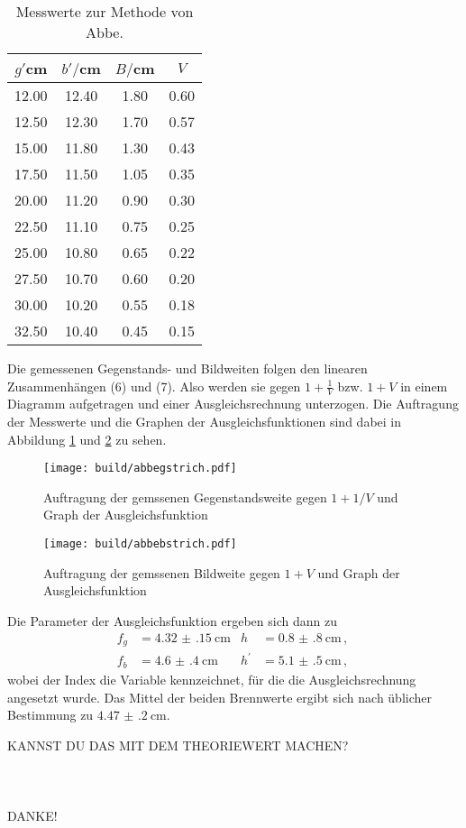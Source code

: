 \begin{table}[htp]
	\begin{center}
    \caption{Messwerte zur Methode von Abbe.}
    \label{tab:abbe}
		\begin{tabular}{cccc}
		\toprule
			{$g'$cm} & {$b'/$cm} & {$B/$cm} & {$V$}\\
			\midrule
			12.00 & 12.40 & 1.80 & 0.60\\
			12.50 & 12.30 & 1.70 & 0.57\\
			15.00 & 11.80 & 1.30 & 0.43\\
			17.50 & 11.50 & 1.05 & 0.35\\
			20.00 & 11.20 & 0.90 & 0.30\\
			22.50 & 11.10 & 0.75 & 0.25\\
			25.00 & 10.80 & 0.65 & 0.22\\
			27.50 & 10.70 & 0.60 & 0.20\\
			30.00 & 10.20 & 0.55 & 0.18\\
			32.50 & 10.40 & 0.45 & 0.15\\
		\bottomrule
		\end{tabular}
	\end{center}
\end{table}

Die gemessenen Gegenstands- und Bildweiten folgen den linearen Zusammenhängen
(6) und (7). Also werden sie gegen $1+\frac{1}{V}$ bzw. $1+V$ in einem Diagramm
aufgetragen und einer Ausgleichsrechnung unterzogen. Die Auftragung der Messwerte
und die Graphen der Ausgleichsfunktionen sind dabei in Abbildung \ref{fig:gstrich}
und \ref{fig:bstrich} zu sehen.

\begin{figure}%
  \centering
  \texttt{[image: build/abbegstrich.pdf]}
  \caption{Auftragung der gemssenen Gegenstandsweite gegen $1+1/V$ und Graph der Ausgleichsfunktion}
  \label{fig:gstrich}
\end{figure}

\begin{figure}%
  \centering
  \texttt{[image: build/abbebstrich.pdf]}
  \caption{Auftragung der gemssenen Bildweite gegen $1+V$ und Graph der Ausgleichsfunktion}
  \label{fig:bstrich}
\end{figure}

Die Parameter der Ausgleichsfunktion ergeben sich dann zu
\begin{align*}
	f_g &= \SI{4.32(15)}{\centi\meter}		&		h &= \SI{0.8(8)}{\centi\meter}\,,\ \\
	f_b &= \SI{4.6(4)}{\centi\meter}		&		h^\prime &= \SI{5.1(5)}{\centi\meter}\,,
\end{align*}
wobei der Index die Variable kennzeichnet, für die die Ausgleichsrechnung
angesetzt wurde. Das Mittel der beiden Brennwerte ergibt sich nach üblicher
Bestimmung zu $\SI{4.47(20)}{\centi\meter}$.

KANNST DU DAS MIT DEM THEORIEWERT MACHEN?
\\
\\
\\
\\
DANKE!
